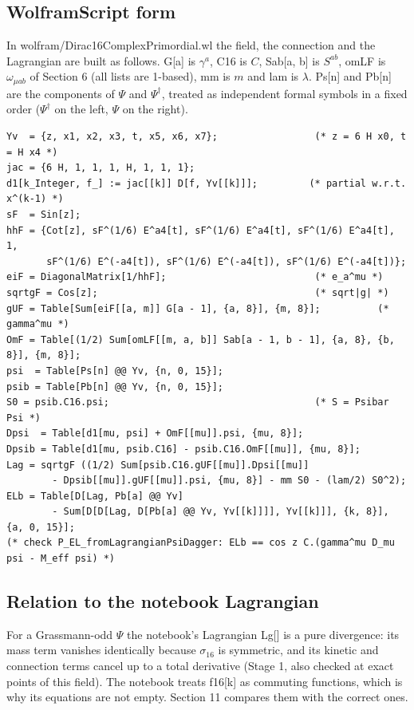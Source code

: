 \documentclass[11pt]{article}
\begin{document}
\subsection{WolframScript form}

In wolfram/Dirac16ComplexPrimordial.wl the field, the connection and the Lagrangian are built as follows. G[a] is $\gamma^a$, C16 is $C$, Sab[a, b] is $S^{ab}$, omLF is $\omega_{\mu ab}$ of Section 6 (all lists are 1-based), mm is $m$ and lam is $\lambda$. Ps[n] and Pb[n] are the components of $\Psi$ and $\Psi^\dagger$, treated as independent formal symbols in a fixed order ($\Psi^\dagger$ on the left, $\Psi$ on the right).

\begin{Verbatim}[fontsize=\small]
Yv  = {z, x1, x2, x3, t, x5, x6, x7};                 (* z = 6 H x0, t = H x4 *)
jac = {6 H, 1, 1, 1, H, 1, 1, 1};
d1[k_Integer, f_] := jac[[k]] D[f, Yv[[k]]];         (* partial w.r.t. x^(k-1) *)
sF  = Sin[z];
hhF = {Cot[z], sF^(1/6) E^a4[t], sF^(1/6) E^a4[t], sF^(1/6) E^a4[t], 1,
       sF^(1/6) E^(-a4[t]), sF^(1/6) E^(-a4[t]), sF^(1/6) E^(-a4[t])};
eiF = DiagonalMatrix[1/hhF];                          (* e_a^mu *)
sqrtgF = Cos[z];                                      (* sqrt|g| *)
gUF = Table[Sum[eiF[[a, m]] G[a - 1], {a, 8}], {m, 8}];          (* gamma^mu *)
OmF = Table[(1/2) Sum[omLF[[m, a, b]] Sab[a - 1, b - 1], {a, 8}, {b, 8}], {m, 8}];
psi  = Table[Ps[n] @@ Yv, {n, 0, 15}];
psib = Table[Pb[n] @@ Yv, {n, 0, 15}];
S0 = psib.C16.psi;                                    (* S = Psibar Psi *)
Dpsi  = Table[d1[mu, psi] + OmF[[mu]].psi, {mu, 8}];
Dpsib = Table[d1[mu, psib.C16] - psib.C16.OmF[[mu]], {mu, 8}];
Lag = sqrtgF ((1/2) Sum[psib.C16.gUF[[mu]].Dpsi[[mu]]
        - Dpsib[[mu]].gUF[[mu]].psi, {mu, 8}] - mm S0 - (lam/2) S0^2);
ELb = Table[D[Lag, Pb[a] @@ Yv]
        - Sum[D[D[Lag, D[Pb[a] @@ Yv, Yv[[k]]]], Yv[[k]]], {k, 8}], {a, 0, 15}];
(* check P_EL_fromLagrangianPsiDagger: ELb == cos z C.(gamma^mu D_mu psi - M_eff psi) *)
\end{Verbatim}

\subsection{Relation to the notebook Lagrangian}

For a Grassmann-odd $\Psi$ the notebook's Lagrangian Lg[] is a pure divergence: its mass term vanishes identically because $\sigma_{16}$ is symmetric, and its kinetic and connection terms cancel up to a total derivative (Stage 1, also checked at exact points of this field). The notebook treats f16[k] as commuting functions, which is why its equations are not empty. Section 11 compares them with the correct ones.
\end{document}
